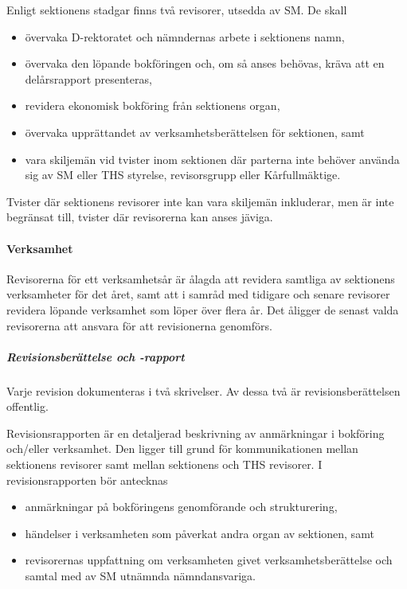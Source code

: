 \documentclass{dgovdoc}
\begin{document}
Enligt sektionens stadgar finns två revisorer, utsedda av SM. De skall

\begin{itemize}
  \item övervaka D-rektoratet och nämndernas arbete i sektionens namn,
  \item övervaka den löpande bokföringen och, om så anses behövas, kräva att en
    delårsrapport presenteras,
  \item revidera ekonomisk bokföring från sektionens organ,
  \item övervaka upprättandet av verksamhetsberättelsen för sektionen, samt
  \item vara skiljemän vid tvister inom sektionen där parterna inte behöver
    använda sig av SM eller THS styrelse, revisorsgrupp eller Kårfullmäktige.
\end{itemize}

Tvister där sektionens revisorer inte kan vara skiljemän inkluderar, men är
inte begränsat till, tvister där revisorerna kan anses jäviga.

\paragraph{Verksamhet}

Revisorerna för ett verksamhetsår är ålagda att revidera samtliga av sektionens
verksamheter för det året, samt att i samråd med tidigare och senare revisorer
revidera löpande verksamhet som löper över flera år. Det åligger de senast
valda revisorerna att ansvara för att revisionerna genomförs.

\subparagraph{Revisionsberättelse och -rapport}

Varje revision dokumenteras i två skrivelser. Av dessa två är
revisionsberättelsen offentlig.

Revisionsrapporten är en detaljerad beskrivning av anmärkningar i bokföring
och/eller verksamhet. Den ligger till grund för kommunikationen mellan
sektionens revisorer samt mellan sektionens och THS revisorer. I
revisionsrapporten bör antecknas

\begin{itemize}
  \item anmärkningar på bokföringens genomförande och strukturering,
  \item händelser i verksamheten som påverkat andra organ av sektionen, samt
  \item revisorernas uppfattning om verksamheten givet verksamhetsberättelse
    och samtal med av SM utnämnda nämndansvariga.
\end{itemize}
\end{document}
